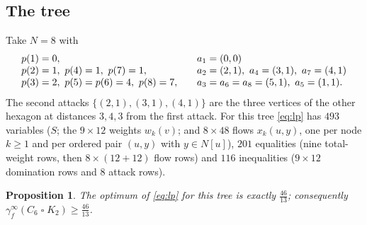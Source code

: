 \documentclass[11pt]{amsart}
\newtheorem{proposition}[theorem]{Proposition}
\theoremstyle{remark}
\newcommand{\fed}{\gamma_f^{\infty}}
\begin{document}
\subsection{The tree}
Take $N=8$ with
\[
\begin{array}{l@{\qquad}l}
 p(1)=0, & a_1=(0,0)\\
 p(2)=1,\ p(4)=1,\ p(7)=1, & a_2=(2,1),\ a_4=(3,1),\ a_7=(4,1)\\
 p(3)=2,\ p(5)=p(6)=4,\ p(8)=7, & a_3=a_6=a_8=(5,1),\ a_5=(1,1).
\end{array}
\]
The second attacks $\{(2,1),(3,1),(4,1)\}$ are the three vertices of the other
hexagon at distances $3,4,3$ from the first attack. For this tree
\eqref{eq:lp} has $493$ variables ($S$; the $9\times12$ weights $w_k(v)$; and
$8\times48$ flows $x_k(u,y)$, one per node $k\ge1$ and per ordered pair
$(u,y)$ with $y\in N[u]$), $201$ equalities (nine total-weight rows, then
$8\times(12+12)$ flow rows) and $116$ inequalities ($9\times12$ domination
rows and $8$ attack rows).

\begin{proposition}\label{prop:lower}
The optimum of \eqref{eq:lp} for this tree is exactly $\tfrac{46}{13}$;
consequently $\fed(C_6\mathbin{\square}K_2)\ge\tfrac{46}{13}$.
\end{proposition}
\end{document}

